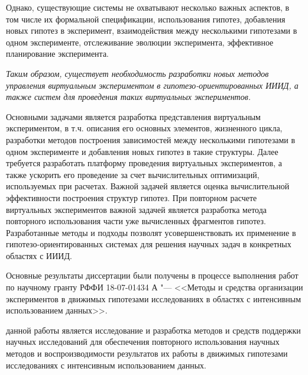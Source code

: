 Однако, существующие системы не охватывают несколько важных аспектов, в том числе их формальной спецификации, 
использования гипотез, добавления новых гипотез в эксперимент, взаимодействия между несколькими гипотезами в 
одном эксперименте, отслеживание эволюции эксперимента, эффективное планирование эксперимента. 

\textit{Таким образом, существует необходимость разработки новых методов управления виртуальным экспериментом 
 в гипотезо-ориентированных ИИИД, а также систем для проведения таких виртуальных экспериментов.}
 
Основными задачами является разработка представления виртуальным экспериментом, в т.ч. описания его основных 
элементов, жизненного цикла, разработки методов построения зависимостей между несколькими гипотезами в одном 
эксперименте и добавления новых гипотез в такие структуры. Далее требуется разработать платформу 
проведения виртуальных экспериментов, а также ускорить его проведение за счет вычислительных оптимизаций, 
используемых при расчетах. Важной задачей является оценка вычислительной эффективности построения структур гипотез. 
При повторном расчете виртуальных экспериментов важной задачей является разработка 
метода повторного использования части уже вычисленных фрагментов гипотез. 
Разработанные методы и подходы позволят 
усовершенствовать их применение в гипотезо-ориентированных системах для решения научных задач 
в конкретных областях с ИИИД.

Основные результаты диссертации были получены в процессе выполнения работ по научному гранту 
РФФИ 18-07-01434 А "--- <<Методы и средства организации экспериментов в движимых гипотезами исследованиях 
в областях с интенсивным использованием данных>>.



{\aim} данной работы является исследование и разработка методов и средств поддержки научных 
исследований для обеспечения повторного использования научных методов и воспроизводимости результатов 
их работы в движимых гипотезами исследованиях с интенсивным использованием данных.


